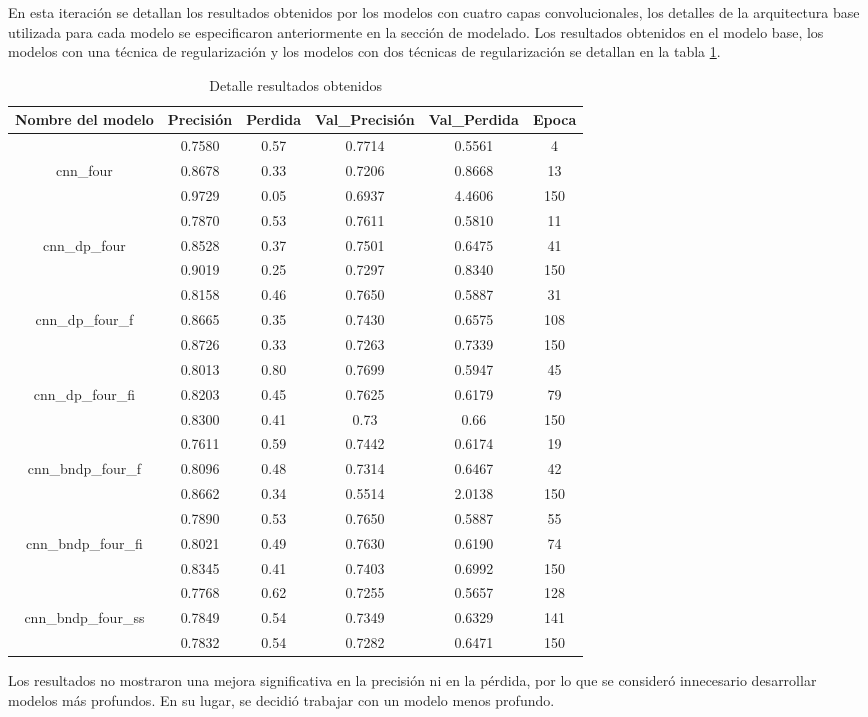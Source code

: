En esta iteración se detallan los resultados obtenidos por los modelos con cuatro capas convolucionales, los detalles de la arquitectura base utilizada para cada modelo se especificaron anteriormente en la sección de modelado. 
Los resultados obtenidos en el modelo base, los modelos con una técnica de regularización y los modelos con dos técnicas de regularización se detallan en la tabla \ref{tbl:10}.

\begin{table}[!ht]
	\centering
	\begin{tabular}{|c|c|c|c|c|c|}
		\hline
		\textbf{Nombre del modelo} & \textbf{Precisión} & \textbf{Perdida} & \textbf{Val\_Precisión} & \textbf{Val\_Perdida} & \textbf{Epoca} \\ \hline
		~ & 0.7580 & 0.57 & 0.7714 & 0.5561 & 4 \\ \cline{2-6}
		cnn\_four & 0.8678 & 0.33 & 0.7206 & 0.8668 & 13 \\ \cline{2-6}
		~ & 0.9729 & 0.05 & 0.6937 & 4.4606 & 150 \\ \hline
		~ & 0.7870 & 0.53 & 0.7611 & 0.5810 & 11 \\ \cline{2-6}
		cnn\_dp\_four & 0.8528 & 0.37 & 0.7501 & 0.6475 & 41 \\ \cline{2-6}
		~ & 0.9019 & 0.25 & 0.7297 & 0.8340 & 150 \\ \hline
		~ & 0.8158 & 0.46 & 0.7650 & 0.5887 & 31 \\ \cline{2-6}
		cnn\_dp\_four\_f & 0.8665 & 0.35 & 0.7430 & 0.6575 & 108 \\ \cline{2-6}
		~ & 0.8726 & 0.33 & 0.7263 & 0.7339 & 150 \\ \hline
		~ & 0.8013 & 0.80 & 0.7699 & 0.5947 & 45 \\ \cline{2-6}
		cnn\_dp\_four\_fi & 0.8203 & 0.45 & 0.7625 & 0.6179 & 79 \\ \cline{2-6}
		~ & 0.8300 & 0.41 & 0.73 & 0.66 & 150 \\ \hline
		~ & 0.7611 & 0.59 & 0.7442 & 0.6174 & 19 \\ \cline{2-6}
		cnn\_bndp\_four\_f & 0.8096 & 0.48 & 0.7314 & 0.6467 & 42 \\ \cline{2-6}
		~ & 0.8662 & 0.34 & 0.5514 & 2.0138 & 150 \\ \hline
		~ & 0.7890 & 0.53 & 0.7650 & 0.5887 & 55 \\ \cline{2-6}
		cnn\_bndp\_four\_fi & 0.8021 & 0.49 & 0.7630 & 0.6190 & 74 \\ \cline{2-6}
		~ & 0.8345 & 0.41 & 0.7403 & 0.6992 & 150 \\ \hline
		~ & 0.7768 & 0.62 & 0.7255 & 0.5657 & 128 \\ \cline{2-6}
		cnn\_bndp\_four\_ss & 0.7849 & 0.54 & 0.7349 & 0.6329 & 141 \\ \cline{2-6}
		~ & 0.7832 & 0.54 & 0.7282 & 0.6471 & 150 \\ \hline
	\end{tabular}
	\caption{Detalle resultados obtenidos}
	\label{tbl:10}
\end{table}

Los resultados no mostraron una mejora significativa en la precisión ni en la pérdida, por lo que se consideró innecesario desarrollar modelos más profundos. En su lugar, se decidió trabajar con un modelo menos profundo.
